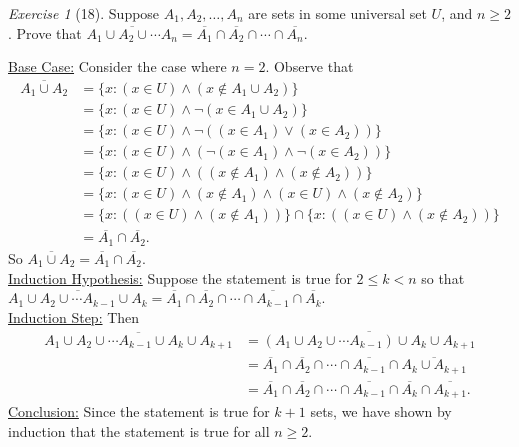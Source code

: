 \documentclass[12pt]{amsart}
\makeatletter
\theoremstyle{remark}
\newtheorem*{exercise}{Exercise}%
\renewenvironment{proof}[1][\proofname]{\par\doublespacing
  \pushQED{\qed}%
  \normalfont \topsep6\p@\@plus6\p@\relax
  \list{}{%
    \settowidth{\leftmargin}{\itshape\proofname:\hskip\labelsep}%
    \setlength{\labelwidth}{0pt}%
    \setlength{\itemindent}{-\leftmargin}%
  }%
  \item[\hskip\labelsep\itshape#1\@addpunct{:}]\ignorespaces
}{%
  \popQED\endlist\@endpefalse
  \singlespacing
}
\theoremstyle{mycomment}
\makeatother
\begin{document}
\begin{exercise}[18] Suppose $A_{1},A_{2},\ldots, A_{n}$ are sets in some universal set $U$, and $n\ge 2$. Prove that $\overline{A_{1}\cup A_{2}\cup \cdots A_{n}}=\overline{A_{1}}\cap\overline{A_{2}}\cap\cdots \cap\overline{A_{n}}$.
\begin{proof}
  \underline{Base Case:} Consider the case where $n = 2$. Observe that 
  \begin{align*}
    \overline{A_1 \cup A_2} &= \{x : (x \in U) \land (x \notin A_1 \cup A_2)\} \\
                            &= \{x : (x \in U) \land \lnot (x \in A_1 \cup A_2)\} \\
                            &= \{x : (x \in U) \land \lnot ((x \in A_1) \lor (x \in A_2))\} \\
                            &= \{x : (x \in U) \land (\lnot(x \in A_1) \land \lnot(x \in A_2))\} \\
                            &= \{x : (x \in U) \land ((x \notin A_1) \land (x \notin A_2))\} \\
                            &= \{x : (x \in U) \land (x \notin A_1) \land (x \in U) \land (x \notin A_2)\} \\
                            &= \{x : ((x \in U) \land (x \notin A_1))\} \cap \{x : ((x \in U) \land (x \notin A_2))\} \\
                            &= \overline{A_1} \cap \overline{A_2}.
  \end{align*}
  So $\overline{A_1 \cup A_2} = \overline{A_1} \cap \overline{A_2}$. \\
  \underline{Induction Hypothesis:} Suppose the statement is true for $2 \leq k < n$ so that 
  \\ $\overline{A_{1}\cup A_{2}\cup \cdots A_{k-1} \cup A_k}=\overline{A_{1}}\cap\overline{A_{2}}\cap\cdots \cap\overline{A_{k-1}} \cap\overline{A_{k}}$.\\
  \underline{Induction Step:} Then 
  \begin{align*}
    \overline{A_{1}\cup A_{2}\cup \cdots A_{k-1} \cup A_k \cup A_{k+1}} &= \overline{(A_{1}\cup A_{2}\cup \cdots A_{k-1}) \cup A_k \cup A_{k+1}} \\
                                                                        &= \overline{A_1} \cap \overline{A_2} \cap \cdots \cap \overline{A_{k-1}} \cap \overline{A_k \cup A_{k+1}} \\
                                                                        &= \overline{A_1} \cap \overline{A_2} \cap \cdots \cap \overline{A_{k-1}} \cap \overline{A_k} \cap \overline{A_{k+1}}. 
  \end{align*}
  \underline{Conclusion:} Since the statement is true for $k+1$ sets, we have shown by induction that the statement is true for all $n \geq 2$.
\end{proof}
\end{exercise}
\end{document}
